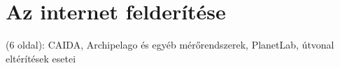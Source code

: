 
\section{Az internet felderítése}
(6 oldal): CAIDA, Archipelago és egyéb mérőrendszerek, PlanetLab, útvonal eltérítések esetei